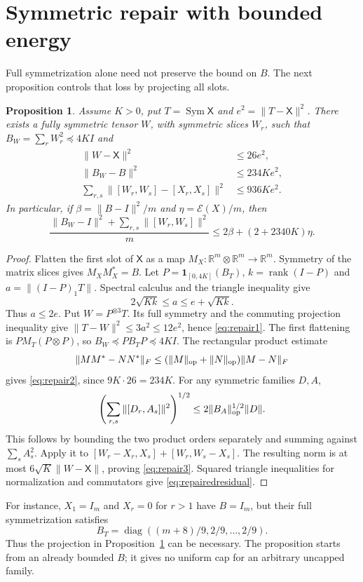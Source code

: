\documentclass[11pt,reqno]{amsart}
\numberwithin{equation}{section}
\newtheorem{proposition}[theorem]{Proposition}
\theoremstyle{remark}
\newcommand{\R}{\mathbb R}
\newcommand{\X}{\mathsf X}
\DeclareMathOperator{\Sym}{Sym}
\DeclareMathOperator{\diag}{diag}
\begin{document}
\section{Symmetric repair with bounded energy}
Full symmetrization alone need not preserve the bound on $B$.
The next proposition controls that loss by projecting all slots.
\begin{proposition}\label{prop:repair}
Assume $K>0$, put $T=\Sym\X$ and $e^2=\|T-\X\|^2$.
There exists a fully symmetric tensor $W$, with symmetric slices $W_r$,
such that $B_W=\sum_rW_r^2\preceq4KI$ and
\begin{align}
 \|W-\X\|^2&\le26e^2,\label{eq:repair1}\\
 \|B_W-B\|^2&\le234Ke^2,\label{eq:repair2}\\
 \sum_{r,s}\|[W_r,W_s]-[X_r,X_s]\|^2&\le936Ke^2.\label{eq:repair3}
\end{align}
In particular, if $\beta=\|B-I\|^2/m$ and $\eta=\mathcal E(X)/m$, then
\begin{equation}\label{eq:repairedresidual}
 \frac{\|B_W-I\|^2+\sum_{r,s}\|[W_r,W_s]\|^2}{m}
 \le2\beta+(2+2340K)\eta.
\end{equation}
\end{proposition}
\begin{proof}
Flatten the first slot of $\X$ as a map
$M_X:\R^m\otimes\R^m\to\R^m$. Symmetry of the matrix slices gives
$M_XM_X^*=B$. Let $P=\mathbf1_{[0,4K]}(B_T)$,
$k=\operatorname{rank}(I-P)$ and $a=\|(I-P)_1T\|$.
Spectral calculus and the triangle inequality give
\[
 2\sqrt{Kk}\le a\le e+\sqrt{Kk}.
\]
Thus $a\le2e$. Put $W=P^{\otimes3}T$. Its full symmetry and the
commuting projection inequality give
$\|T-W\|^2\le3a^2\le12e^2$, hence \eqref{eq:repair1}.
The first flattening is $PM_T(P\otimes P)$, so
$B_W\preceq PB_TP\preceq4KI$.
The rectangular product estimate
\[
 \|MM^*-NN^*\|_F\le(\|M\|_{\rm op}+\|N\|_{\rm op})\|M-N\|_F
\]
gives \eqref{eq:repair2}, since $9K\cdot26=234K$.
For any symmetric families $D,A$,
\[
 \left(\sum_{r,s}\|[D_r,A_s]\|^2\right)^{1/2}
 \le2\|B_A\|_{\rm op}^{1/2}\|D\|.
\]
This follows by bounding the two product orders separately and summing
against $\sum_sA_s^2$. Apply it to
$[W_r-X_r,X_s]+[W_r,W_s-X_s]$.
The resulting norm is at most $6\sqrt K\|W-\X\|$, proving
\eqref{eq:repair3}. Squared triangle inequalities for normalization
and commutators give \eqref{eq:repairedresidual}.
\end{proof}

For instance, $X_1=I_m$ and $X_r=0$ for $r>1$ have $B=I_m$,
but their full symmetrization satisfies
\[
 B_T=\diag((m+8)/9,2/9,\ldots,2/9).
\]
Thus the projection in Proposition~\ref{prop:repair} can be necessary.
The proposition starts from an already bounded $B$; it gives no
uniform cap for an arbitrary uncapped family.
\end{document}
